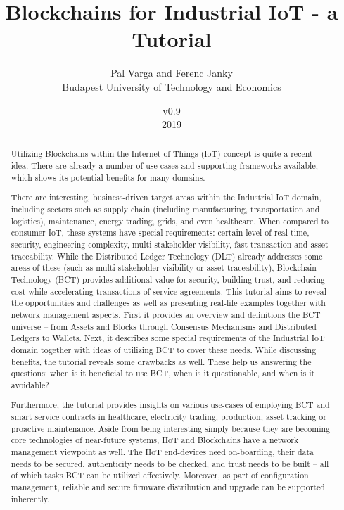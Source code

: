 \documentclass[a4paper]{article}
\title{Blockchains for Industrial IoT - a Tutorial}
\author{Pal Varga and Ferenc Janky \\ Budapest University of Technology and Economics}
\date{v0.9 \\ 2019}
\begin{document}
\maketitle

\begin{abstract}
Utilizing Blockchains within the Internet of Things (IoT) concept is quite a recent idea. There are already a number of use cases and supporting frameworks available, which shows its potential benefits for many domains.

There are interesting, business-driven target areas within the Industrial IoT domain, including sectors such as supply chain (including manufacturing, transportation and logistics), maintenance, energy trading, grids, and even healthcare. When compared to consumer IoT, these systems have special requirements: certain level of real-time, security, engineering complexity, multi-stakeholder visibility, fast transaction and asset traceability. While the Distributed Ledger Technology (DLT) already addresses some areas of these (such as multi-stakeholder visibility or asset traceability), Blockchain Technology (BCT) provides additional value for security, building trust, and reducing cost while accelerating transactions of service agreements.
This tutorial aims to reveal the opportunities and challenges as well as presenting real-life examples together with network management aspects. First it provides an overview and definitions the BCT universe – from Assets and Blocks through Consensus Mechanisms and Distributed Ledgers to Wallets. Next, it describes some special requirements of the Industrial IoT domain together with ideas of utilizing BCT to cover these needs. While discussing benefits, the tutorial reveals some drawbacks as well. These help us answering the questions: when is it beneficial to use BCT, when is it questionable, and when is it avoidable?

Furthermore, the tutorial provides insights on various use-cases of employing BCT and smart service contracts in healthcare, electricity trading, production, asset tracking or proactive maintenance. Aside from being interesting simply because they are becoming core technologies of near-future systems, IIoT and Blockchains have a network management viewpoint as well. The IIoT end-devices need on-boarding, their data needs to be secured, authenticity needs to be checked, and trust needs to be built – all of which tasks BCT can be utilized effectively. Moreover, as part of configuration management, reliable and secure firmware distribution and upgrade can be supported inherently.


\end{abstract}
\end{document}
